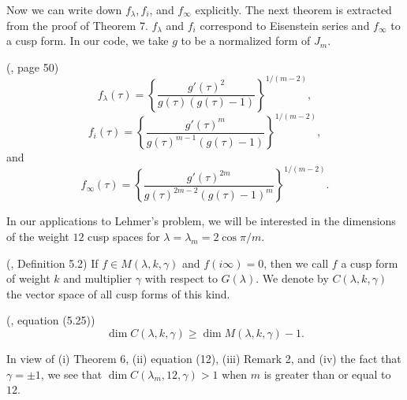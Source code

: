 \documentclass{article}
\begin{document}
 \noindent
 Now we can write down 
 $f_{\lambda}, f_i$, and $f_{\infty}$ explicitly.
 The next theorem is extracted from 
the proof of Theorem 7.
$f_{\lambda}$ and $f_i$
correspond to Eisenstein series and 
$f_{\infty}$ to a cusp form.
In our code, we take
 $g$ to be a normalized form of $J_m$.
 \begin{theorem}
 (\cite{berndt2008hecke}, page 50)
 $$
 f_{\lambda}(\tau)
 =\left \{
 \frac {g'(\tau)^2}
 {g(\tau)(g(\tau) -1)}
 \right \}^{1/(m-2)},
 $$
 $$
 f_i(\tau) =
 \left \{
 \frac {g'(\tau)^m}
 {g(\tau)^{m-1} (g(\tau) - 1)}
 \right \}^{1/(m-2)},
 $$
 and
 $$
 f_{\infty}(\tau) = 
 \left \{ \frac{g'(\tau)^{2m}}
 {g(\tau)^{2m-2}(g(\tau)-1)^m}
\right \}^{1/(m-2)}.
 $$
 \end{theorem}
 \noindent
In our applications to Lehmer's
problem, we will be
interested in the dimensions
of the weight $12$ cusp spaces
for $\lambda = \lambda_m = 2 \cos \pi/m$.
\begin{definition}
(\cite{berndt2008hecke}, Definition 5.2)
If $f\in M(\lambda, k, \gamma)$
and $f(i \infty) = 0$,
then we call $f$ a cusp form of
weight $k$ and multiplier  $\gamma$
with respect to $G(\lambda)$. 
We denote by $C(\lambda,k,  \gamma)$ the
vector space of  all cusp forms
of this kind.
\end{definition}
\begin{remark}
(\cite{berndt2008hecke}, equation (5.25))
$$\dim C(\lambda, k,  \gamma) \geq 
\dim M(\lambda, k,  \gamma) -1.$$
\end{remark}
\begin{remark}
In view of (i) Theorem 6, (ii) equation (12), 
(iii) Remark 2, and (iv)  the fact
that $\gamma = \pm 1$, we see that
$\dim C(\lambda_m, 12,  \gamma) >1$
when $m$ is greater than or equal to $12$.
\end{remark}
\end{document}
